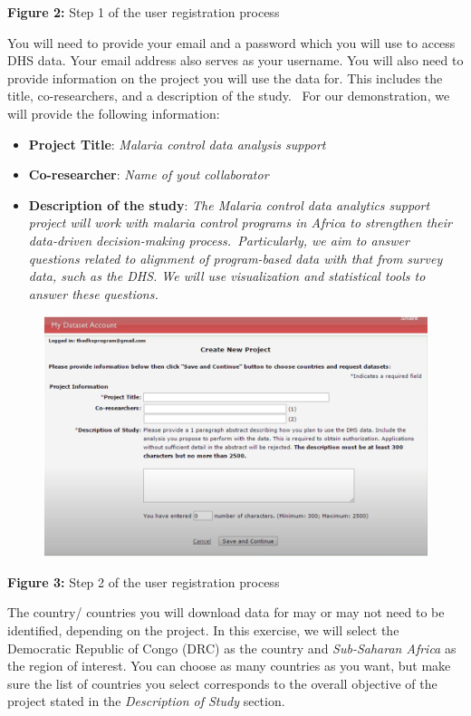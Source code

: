 \documentclass[
  letterpaper,
  DIV=11,
  numbers=noendperiod]{scrreprt}
\begin{document}
\textbf{Figure 2:} Step 1 of the user registration process

You will need to provide your email and a password which you will use to
access DHS data. Your email address also serves as your username. You
will also need to provide information on the project you will use the
data for. This includes the title, co-researchers, and a description of
the study.~ For our demonstration, we will provide the following
information:

\begin{itemize}
\item
  \textbf{Project Title}: \emph{Malaria control data analysis support}
\item
  \textbf{Co-researcher}: \emph{Name of yout collaborator}
\item
  \textbf{Description of the study}: \emph{The Malaria control data
  analytics support project will work with malaria control programs in
  Africa to strengthen their data-driven decision-making
  process.~Particularly, we aim to answer questions related to alignment
  of program-based data with that from survey data, such as the DHS. We
  will use visualization and statistical tools to answer these
  questions.}
\end{itemize}

\begin{figure}

\includegraphics[width=5.41667in,height=\textheight]{plots/image_04.png} \hfill{}

\end{figure}

\textbf{Figure 3:} Step 2 of the user registration process

The country/ countries you will download data for may or may not need to
be identified, depending on the project. In this exercise, we will
select the Democratic Republic of Congo (DRC) as the country and
\emph{Sub-Saharan Africa} as the region of interest. You can choose as
many countries as you want, but make sure the list of countries you
select corresponds to the overall objective of the project stated in the
\emph{Description of Study} section.
\end{document}

